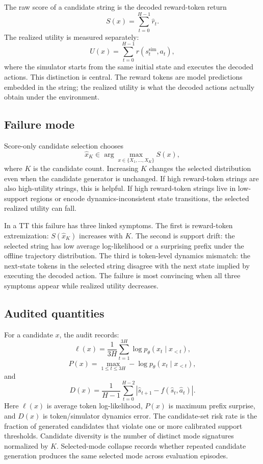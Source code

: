 \documentclass{article}
\newcommand{\score}{S}
\newcommand{\utility}{U}
\begin{document}
The raw score of a candidate string is the decoded reward-token return
\[
\score(x)=\sum_{t=0}^{H-1}\hat r_t.
\]
The realized utility is measured separately:
\[
\utility(x)=\sum_{t=0}^{H-1}r(s_t^{\mathrm{sim}},a_t),
\]
where the simulator starts from the same initial state and executes the decoded actions. This distinction is central. The reward tokens are model predictions embedded in the string; the realized utility is what the decoded actions actually obtain under the environment.

\subsection{Failure mode}

Score-only candidate selection chooses
\[
\hat x_K \in \arg\max_{x\in\{X_1,\ldots,X_K\}}\score(x),
\]
where \(K\) is the candidate count. Increasing \(K\) changes the selected distribution even when the candidate generator is unchanged. If high reward-token strings are also high-utility strings, this is helpful. If high reward-token strings live in low-support regions or encode dynamics-inconsistent state transitions, the selected realized utility can fall.

In a TT this failure has three linked symptoms. The first is reward-token extremization: \(\score(\hat x_K)\) increases with \(K\). The second is support drift: the selected string has low average log-likelihood or a surprising prefix under the offline trajectory distribution. The third is token-level dynamics mismatch: the next-state tokens in the selected string disagree with the next state implied by executing the decoded action. The failure is most convincing when all three symptoms appear while realized utility decreases.

\subsection{Audited quantities}

For a candidate \(x\), the audit records:
\[
\ell(x)=\frac{1}{3H}\sum_{t=1}^{3H}\log p_\theta(x_t\mid x_{<t}),
\]
\[
P(x)=\max_{1\leq t\leq 3H} -\log p_\theta(x_t\mid x_{<t}),
\]
and
\[
D(x)=\frac{1}{H-1}\sum_{t=0}^{H-2}\left|\hat s_{t+1}-f(\hat s_t,\hat a_t)\right|.
\]
Here \(\ell(x)\) is average token log-likelihood, \(P(x)\) is maximum prefix surprise, and \(D(x)\) is token/simulator dynamics error. The candidate-set risk rate is the fraction of generated candidates that violate one or more calibrated support thresholds. Candidate diversity is the number of distinct mode signatures normalized by \(K\). Selected-mode collapse records whether repeated candidate generation produces the same selected mode across evaluation episodes.
\end{document}
